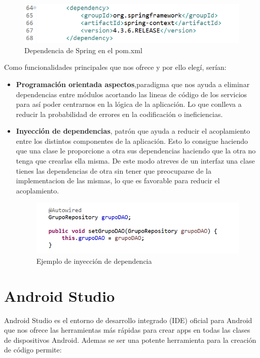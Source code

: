 \begin{figure}[H]
		\centering
		\includegraphics[width=\textwidth] {spring.png}
		\caption{Dependencia de Spring en el pom.xml }\label{fig:spring}
	\end{figure}
	
	
Como funcionalidades principales que nos ofrece y por ello elegí, serían:

\begin{itemize}
\item \textbf{Programación orientada aspectos},paradigma que nos ayuda a eliminar dependencias entre módulos acortando las lineas de código de los servicios para así poder centrarnos en la lógica de la aplicación. Lo que conlleva a reducir  la probabilidad de errores en la codificación o ineficiencias.


\item\textbf{ Inyección de dependencias}, patrón que ayuda a reducir el acoplamiento entre los distintos componentes de la aplicación. Esto lo consigue haciendo que una clase le proporcione a otra sus dependencias haciendo que la otra no tenga que crearlas ella misma. De este modo atreves de un interfaz una clase tienes las dependencias de otra sin tener que preocuparse de la implementacion de las mismas, lo que es favorable para reducir el acoplamiento.

\begin{figure}[H]
		\centering
		\includegraphics[width=\textwidth] {dao.png}
		\caption{Ejemplo de inyección de dependencia }\label{fig:dao}
	\end{figure}


\end{itemize}


\section{Android Studio}
Android Studio es el entorno de desarrollo integrado (IDE)  oficial para Android que nos ofrece las herramientas más rápidas para crear apps en todas las clases de dispositivos Android.
Ademas se ser una potente herramienta para la creación de código permite:


